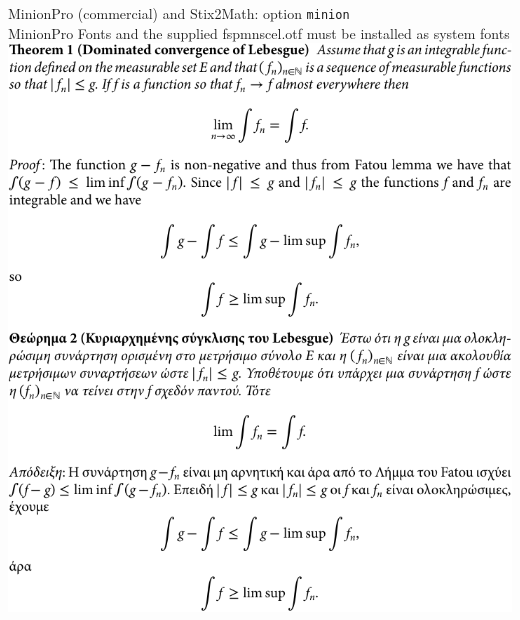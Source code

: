 \documentclass{book}
\begin{document}
\newpage

\begin{center}
{\Large MinionPro (commercial) and Stix2Math: option \verb|minion|}\\
MinionPro Fonts and the supplied fspmnscel.otf must
be installed as system fonts\\[1cm] 
\includegraphics[scale=1.2]{fspsample-minion.pdf}
\end{center}

\newpage
\end{document}
